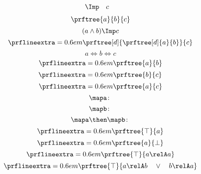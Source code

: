 {\begin{forslides}
\begin{equation*}
\begin{aligned}
        \Imp \quad &c
\end{aligned}
\end{equation*}
    \begin{equation*}
        \label{eq:abc_3}
        \prftree{a}{b}{c}
\end{equation*}
        \begin{equation*}
        \label{eq:abc_4}
        (a\wedge b)\Imp c
\end{equation*}
\begin{equation*}
    \label{eq:abc_5}
    \prflineextra=0.6em
    \prftree[d]
    {\prftree[d]
    {a}
      {b}}
    {c}
\end{equation*}
\begin{equation*}
    \label{eq:abc_6}
    a\Leftrightarrow b \Leftrightarrow c
\end{equation*}
    \begin{equation*}
    \label{eq:abc_7}
    \prflineextra=0.6em
    \prftree{a}{b}
\end{equation*}
        \begin{equation*}
    \label{eq:abc_8}
    \prflineextra=0.6em
    \prftree{b}{c}
\end{equation*}
            \begin{equation*}
    \label{eq:abc_9}
    \prflineextra=0.6em
    \prftree{a}{c}
\end{equation*}
\begin{equation*}
    \label{eq:mapf}
    \mapa \colon
\end{equation*}
\begin{equation*}
    \label{eq:mapg}
    \mapb \colon
\end{equation*}
\begin{equation*}
    \label{eq:mapcomp}
    \mapa \then \mapb \colon
\end{equation*}
\begin{equation*}
    \label{eq:top1}
    \prflineextra=0.6em
    \prftree{\top}{a}
\end{equation*}
\begin{equation*}
    \label{eq:bot1}
    \prflineextra=0.6em
    \prftree{a}{\bot}
\end{equation*}
\begin{equation*}
    \label{eq:rel_refl}
    \prflineextra=0.6em
    \prftree{\top}{a\relA a}
\end{equation*}
\begin{equation*}
    \label{eq:rel_tot}
    \prflineextra=0.6em
    \prftree{\top}{a\relA b \quad \vee \quad b\relA a}

\end{equation*}
\end{forslides}}
